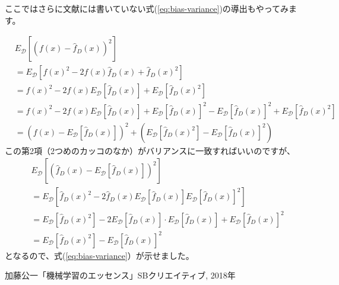 \documentclass[11pt]{article}
\begin{document}
ここではさらに文献\cite{mle}には書いていない式(\ref{eq:bias-variance})の導出もやってみます。

\begin{align*}
&E_{\mathcal{D}} \left[
\left(f(x)-\hat{f}_D(x)\right)^2
\right]\\
&=
E_{\mathcal{D}} \left[
f(x)^2-2f(x)\hat{f}_D(x) + \hat{f}_D(x)^2
\right]
\\
&=
f(x)^2-2f(x) E_{\mathcal{D}} \left[\hat{f}_D(x)\right]
+ E_{\mathcal{D}} \left[\hat{f}_D(x)^2\right]
\\
&=
f(x)^2-2f(x) E_{\mathcal{D}} \left[\hat{f}_D(x)\right]
+ E_{\mathcal{D}} \left[\hat{f}_D(x)\right]^2
- E_{\mathcal{D}} \left[\hat{f}_D(x)\right]^2
+ E_{\mathcal{D}} \left[\hat{f}_D(x)^2\right]
\\
&=
\left(f(x)-E_{\mathcal{D}}
\left[\hat{f}_D(x)\right]
\right)^2
+ \left(
E_{\mathcal{D}} \left[\hat{f}_D(x)^2\right]
- E_{\mathcal{D}} \left[\hat{f}_D(x)\right]^2
\right)
\end{align*}
この第2項（2つめのカッコのなか）がバリアンスに一致すればいいのですが、
\begin{align*}
&E_{\mathcal{D}}\left[
\left(\hat{f}_D(x) -
E_{\mathcal{D}}\left[\hat{f}_D(x)\right]\right)^2
\right]\\
&=
E_{\mathcal{D}}\left[
\hat{f}_D(x)^2
-2\hat{f}_D(x) E_{\mathcal{D}}\left[\hat{f}_D(x)\right]
E_{\mathcal{D}}\left[\hat{f}_D(x)\right]^2
\right]\\
&=
E_{\mathcal{D}}\left[
  \hat{f}_D(x)^2
  \right]
-2E_{\mathcal{D}}\left[\hat{f}_D(x)\right] \cdot E_{\mathcal{D}}\left[\hat{f}_D(x)\right]
+E_{\mathcal{D}}\left[\hat{f}_D(x)\right]^2\\
&=
E_{\mathcal{D}}\left[
  \hat{f}_D(x)^2
  \right]
-E_{\mathcal{D}}\left[\hat{f}_D(x)\right]^2
\end{align*}
となるので、式(\ref{eq:bias-variance}）が示せました。

\begin{thebibliography}{99}
 加藤公一「機械学習のエッセンス」SBクリエイティブ, 2018年
\end{thebibliography}
\end{document}
